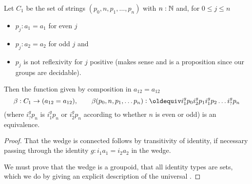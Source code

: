 {\begin{lemma}
Let $C_1$ be the set of strings $(p_0,n,p_1,\dots,p_n)$ with $n:\mathbb{N}$ and, for $0\leq j\leq n$ 
\begin{itemize}
\item $p_{j}:a_1=a_1$ for even $j$ 
\item $p_{j}:a_2=a_2$ for odd $j$ and 
\item $p_j$ is not reflexivity for $j$ positive (makes sense and is a proposition since our groups are decidable).
\end{itemize}
  Then the function given by composition in $a_{12}=a_{12}$
$$\beta:C_1\to(a_{12}=a_{12}),\qquad\beta(p_0,n,p_1,\dots p_n)\defequi i_1^gp_0i_2^gp_1i_1^gp_2\dots i_?^gp_n$$ 
(where $i_?^gp_n$  is $i_1^gp_n$ or $i_2^gp_n$ according to whether $n$ is even or odd) is an equivalence.
\end{lemma}
\begin{proof}
That the wedge is connected follows by transitivity of identity, if necessary passing through the identity $g:i_1a_1=i_2a_2$ in the wedge.

We must prove that the wedge is a groupoid, \ie that all identity types are sets, which we do by giving an explicit description of the universal \covering. 


\end{proof}}
